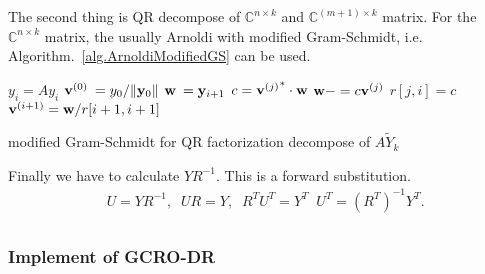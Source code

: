 The second thing is QR decompose of $\mathbb{C}^{n\times k}$ and $\mathbb{C}^{(m+1)\times k}$ matrix. For the $\mathbb{C}^{n\times k}$ matrix, the usually Arnoldi with modified Gram-Schmidt, i.e. Algorithm.~\ref{alg.ArnoldiModifiedGS} can be used.
\begin{algorithm}[H]
\begin{algorithmic}
    \State $y_i=Ay_i$
\EndFor
\State ${\bf v}^{(0)}\:=y_0/\|{\bf y}_0\|$
    \State ${\bf w}\:={\bf y}_{i+1}$
        \State $c={{\bf v}^{(j)}}^*\cdot {\bf w}$
        \State ${\bf w}-=c{\bf v}^{(j)}$
        \State $r[j,i]=c$
    \EndFor
    \State ${\bf v}^{(i+1)}={\bf w}/r[i+1,i+1]$
\EndFor

\end{algorithmic}
\caption{modified Gram-Schmidt for QR factorization decompose of $A\tilde{Y}_k$}
\end{algorithm}

Finally we have to calculate $YR^{-1}$. This is a forward substitution.
\begin{equation}
\begin{split}
&U=YR^{-1},\;\; UR=Y,\;\;R^{T}U^{T}=Y^T\;\;U^{T}=\left(R^{T}\right)^{-1}Y^T.\\
\end{split}
\end{equation}

\subsubsection{\label{sec:impgcrodr}Implement of GCRO-DR}

